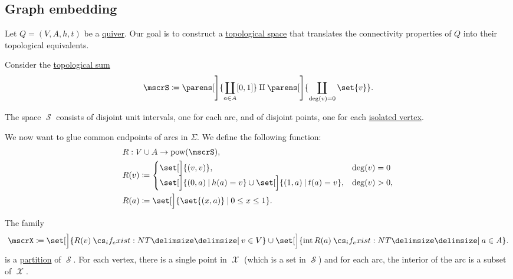 \subsection{Graph embedding}\label{subsec:graph_embedding}

\begin{definition}\label{def:quiver_geometric_realization}
  Let \( Q = (V, A, h, t) \) be a \hyperref[def:quiver]{quiver}. Our goal is to construct a \hyperref[def:topological_space]{topological space} that translates the connectivity properties of \( Q \) into their topological equivalents.

  Consider the \hyperref[def:topological_sum]{topological sum}
  \begin{equation*}
    \mscrS \coloneqq \parens[\Bigg]{ \coprod_{a \in A} [0, 1] } \amalg \parens[\Bigg]{ \coprod_{\deg(v) = 0} \set{ v } }.
  \end{equation*}

  The space \( \mscrS \) consists of disjoint unit intervals, one for each arc, and of disjoint points, one for each \hyperref[def:hypergraph/degree]{isolated vertex}.

  We now want to glue common endpoints of arcs in \( \Sigma \). We define the following function:
  \begin{equation}\label{eq:def:quiver_geometric_realization}
    \begin{aligned}
      &R: V \cup A \to \pow(\mscrS), \\
      &R(v) \coloneqq \begin{cases}
        \set[\Big]{ (v, v) },                                                           &\deg(v) = 0 \\
        \set[\Big]{ (0, a) \given h(a) = v } \cup \set[\Big]{ (1, a) \given t(a) = v }, &\deg(v) > 0,
      \end{cases} \\
      &R(a) \coloneqq \set[\Big]{ \set{ (x, a) } \given 0 \leq x \leq 1 }.
    \end{aligned}
  \end{equation}

  The family
  \begin{equation*}
    \mscrX \coloneqq \set[\Big]{ R(v) \given* v \in V } \cup \set[\Big]{ \Int R(a) \given* a \in A }.
  \end{equation*}
  is a \hyperref[def:set_partition]{partition} of \( \mscrS \). For each vertex, there is a single point in \( \mscrX \) (which is a set in \( \mscrS \)) and for each arc, the interior of the arc is a subset of \( \mscrX \).


\end{definition}
